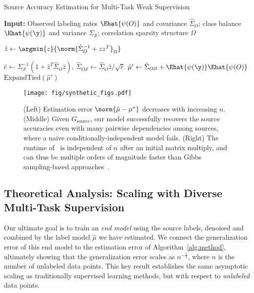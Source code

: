 \documentclass[letterpaper]{article}
\begin{document}
\begin{algorithm}[tb]
	\caption{Source Accuracy Estimation for Multi-Task Weak Supervision}
   	\label{alg:method}
	\begin{algorithmic}
\State \textbf{Input:}
			Observed labeling rates $\Ehat{\psi(O)}$ and covariance $\hat{\Sigma}_O$;
			class balance $\Ehat{\psi(\y)}$ and variance $\Sigma_\mathcal{S}$;
			correlation sparsity structure $\Omega$

		\State $\hat{z} \leftarrow \argmin{z}{ \norm{ \hat{\Sigma}_O^{-1} + zz^T }_\Omega}$

\State $\hat{c} \leftarrow \Sigma_\mathcal{S}^{-1}(1 + \hat{z}^T\hat{\Sigma}_O\hat{z})$, $\hat{\Sigma}_{O\mathcal{S}} \leftarrow \hat{\Sigma}_O\hat{z} / \sqrt{\hat{c}}$
		\State $\hat{\mu}' \leftarrow \hat{\Sigma}_{O\mathcal{S}} + \Ehat{\psi(\y)} \Ehat{\psi(O)}$
			\\
		\Return $\text{ExpandTied}(\hat{\mu}')$
	\end{algorithmic}
\end{algorithm}

\begin{figure*}
    \centering
    \texttt{[image: fig/synthetic\_figs.pdf]}
    \caption{(Left) Estimation error $\norm{ \hat{\mu} - \mu^* }$ decreases with increasing $n$. (Middle) Given $G_{\text{source}}$, our model successfully recovers the source accuracies even with many pairwise dependencies among sources, where a naive conditionally-independent model fails. (Right) The runtime of \systemx~is independent of $n$ after an initial matrix multiply, and can thus be multiple orders of magnitude faster than Gibbs sampling-based approaches~\cite{ratner2016data}.}
    \label{fig:synthetic_fig}
\end{figure*}

\subsection{Theoretical Analysis: Scaling with Diverse Multi-Task Supervision}
Our ultimate goal is to train an \textit{end model} using the source labels, denoised and combined by the label model $\hat{\mu}$ we have estimated.
We connect the generalization error of this end model to the estimation error of Algorithm~\ref{alg:method}, ultimately showing that the generalization error scales as $n^{-\frac12}$, where $n$ is the number of unlabeled data points.
This key result establishes the same asymptotic scaling as traditionally supervised learning methods, but with respect to \textit{unlabeled} data points.
\end{document}
